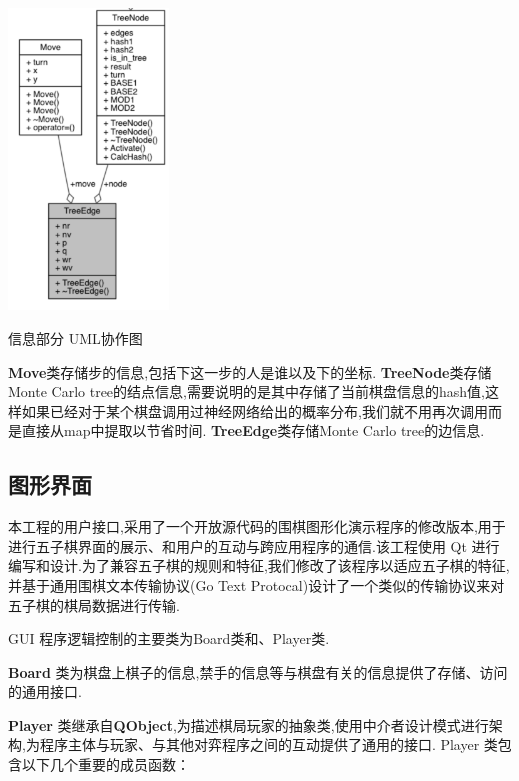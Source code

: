\documentclass[twocolumn]{article}
\begin{document}
\begin{center}
\makeatletter
\def\@captype{figure}
\makeatother
\includegraphics [height=8cm]{info.png}
\caption{信息部分 UML协作图}
\label{info}
\end{center}

\textbf{Move}类存储步的信息,包括下这一步的人是谁以及下的坐标.
\textbf{TreeNode}类存储Monte Carlo tree的结点信息,需要说明的是其中存储了当前棋盘信息的hash值,这样如果已经对于某个棋盘调用过神经网络给出的概率分布,我们就不用再次调用而是直接从map中提取以节省时间.
\textbf{TreeEdge}类存储Monte Carlo tree的边信息.

\subsection{图形界面}

本工程的用户接口,采用了一个开放源代码的围棋图形化演示程序\cite{fff}的修改版本,用于进行五子棋界面的展示、和用户的互动与跨应用程序的通信.该工程使用 Qt 进行编写和设计.为了兼容五子棋的规则和特征,我们修改了该程序以适应五子棋的特征,并基于通用围棋文本传输协议(Go Text Protocal)设计了一个类似的传输协议来对五子棋的棋局数据进行传输.

GUI 程序逻辑控制的主要类为Board类和、Player类.

\textbf{Board} 类为棋盘上棋子的信息,禁手的信息等与棋盘有关的信息提供了存储、访问的通用接口.

\textbf{Player} 类继承自\textbf{QObject},为描述棋局玩家的抽象类,使用中介者设计模式进行架构,为程序主体与玩家、与其他对弈程序之间的互动提供了通用的接口. Player 类包含以下几个重要的成员函数：
\end{document}
